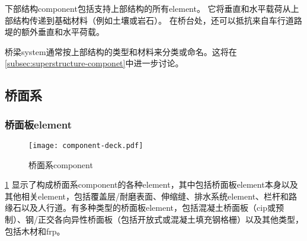 下部结构\gls*{component}包括支持上部结构的所有\gls*{element}。 它将垂直和水平载荷从上部结构传递到基础材料（例如土壤或岩石）。 在桥台处，还可以抵抗来自车行道路堤的额外垂直和水平荷载。

桥梁\gls*{system}通常按上部结构的类型和材料来分类或命名。这将在\cref{subsec:superstructure-componet}中进一步讨论。

\subsection{桥面系}
\label{subsec:deck-component}
\subsubsection{桥面板\gls*{element}}

\begin{figure}
  \texttt{[image: component-deck.pdf]}
  \caption{桥面系\gls*{component}}
  \label{fig:deck-component}
\end{figure}

\cref{fig:deck-component} 显示了构成桥面系\gls*{component}的各种\gls*{element}，其中包括桥面板\gls*{element}本身以及其他相关\gls*{element}，包括覆盖层/耐磨表面、伸缩缝、排水系统\gls*{element}、栏杆和路缘石以及人行道。有多种类型的桥面板\gls*{element}，包括混凝土桥面板（\acrfull{cip}或预制）、钢/正交各向异性桥面板（包括开放式或混凝土填充钢格栅）以及其他类型，包括木材和\acrfull{frp}。

